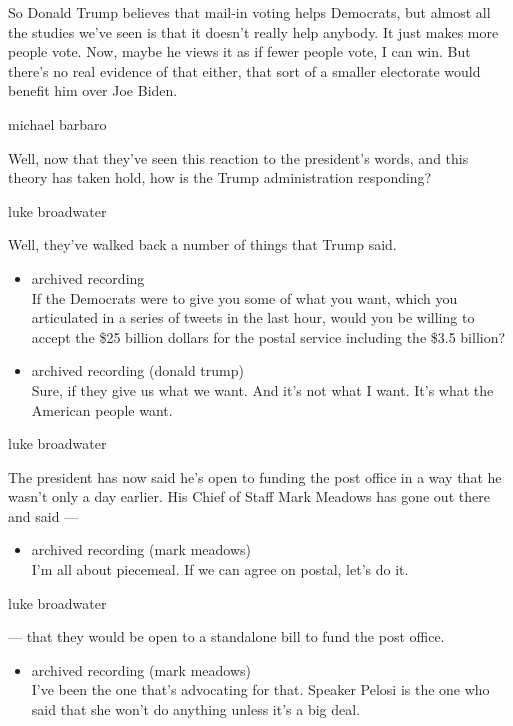 So Donald Trump believes that mail-in voting helps Democrats, but almost
all the studies we've seen is that it doesn't really help anybody. It
just makes more people vote. Now, maybe he views it as if fewer people
vote, I can win. But there's no real evidence of that either, that sort
of a smaller electorate would benefit him over Joe Biden.

michael barbaro

Well, now that they've seen this reaction to the president's words, and
this theory has taken hold, how is the Trump administration responding?

luke broadwater

Well, they've walked back a number of things that Trump said.

\begin{itemize}
\item
  archived recording\\
  If the Democrats were to give you some of what you want, which you
  articulated in a series of tweets in the last hour, would you be
  willing to accept the \$25 billion dollars for the postal service
  including the \$3.5 billion?
\item
  archived recording (donald trump)\\
  Sure, if they give us what we want. And it's not what I want. It's
  what the American people want.
\end{itemize}

luke broadwater

The president has now said he's open to funding the post office in a way
that he wasn't only a day earlier. His Chief of Staff Mark Meadows has
gone out there and said ---

\begin{itemize}
\tightlist
\item
  archived recording (mark meadows)\\
  I'm all about piecemeal. If we can agree on postal, let's do it.
\end{itemize}

luke broadwater

--- that they would be open to a standalone bill to fund the post
office.

\begin{itemize}
\tightlist
\item
  archived recording (mark meadows)\\
  I've been the one that's advocating for that. Speaker Pelosi is the
  one who said that she won't do anything unless it's a big deal.
\end{itemize}

